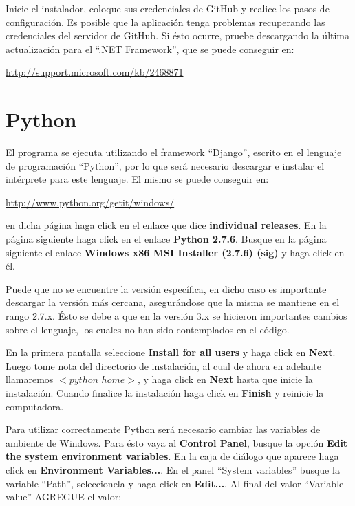 \documentclass[9pt, letterpaper, oneside]{report}
\begin{document}
    Inicie el instalador, coloque sus credenciales de GitHub y realice los pasos de
    configuración. Es posible que la aplicación tenga problemas recuperando las
    credenciales del servidor de GitHub. Si ésto ocurre, pruebe descargando la
    última actualización para el ``.NET Framework'', que se puede conseguir en:

    \vspace{3mm}
    \url{http://support.microsoft.com/kb/2468871}
    \vspace{3mm}

  \section{Python}
    El programa se ejecuta utilizando el framework ``Django'', escrito en el lenguaje de
    programación ``Python'', por lo que será necesario descargar e instalar el
    intérprete para este lenguaje. El mismo se puede conseguir en:

    \vspace{3mm}
    \url{http://www.python.org/getit/windows/}
    \vspace{3mm}
      
    en dicha página haga click en el enlace que dice \textbf{individual
    releases}. En la página
    siguiente haga click en el enlace \textbf{Python 2.7.6}. Busque en la página siguiente
    el enlace \textbf{Windows x86 MSI Installer (2.7.6) (sig)} y haga click en él.

    Puede que no se encuentre la versión específica, en dicho caso es importante
    descargar la versión más cercana, asegurándose que la misma se mantiene en el
    rango 2.7.x. Ésto se debe a que en la versión 3.x se hicieron importantes
    cambios sobre el lenguaje, los cuales no han sido contemplados en el código.

    En la primera pantalla seleccione \textbf{Install for all users} y haga
    click en \textbf{Next}.
    Luego tome nota del directorio de instalación, al cual de ahora en adelante
    llamaremos $<python\_home>$, y haga click en \textbf{Next} hasta que inicie la
    instalación. Cuando finalice la instalación haga click en \textbf{Finish} y reinicie
    la computadora.

    Para utilizar correctamente Python será necesario cambiar las variables de
    ambiente de Windows. Para ésto vaya al \textbf{Control Panel}, busque la opción
    \textbf{Edit the system environment variables}. En la caja de diálogo que aparece haga
    click en \textbf{Environment Variables...}. En el panel ``System variables'' busque la
    variable ``Path'', seleccionela y haga click en \textbf{Edit...}. Al final del valor
    ``Variable value'' AGREGUE el valor:
\end{document}
